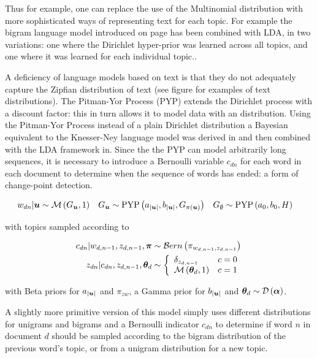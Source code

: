 Thus for example, one can replace the use of the Multinomial distribution with more sophisticated ways of representing text for each topic. For example the bigram language model introduced on page \pageref{sec:chap1:mackay-lang-model} has been combined with LDA, in two variations\cite{Wallach2006}: one where the Dirichlet hyper-prior was learned across all topics, and one where it was learned for each individual topic..

A deficiency of language models based on text is that they do not adequately capture the Zipfian distribution of text (see figure for examples of text distributions). The Pitman-Yor Process (PYP) extends the Dirichlet process with a discount factor: this in turn allows it to model data with an  distribution. Using the Pitman-Yor Process instead of a plain Dirichlet distribution a Bayesian equivalent to the Knesser-Ney language model was derived in\cite{Teh2002} and then combined with the LDA framework in\cite{Lindsey2012}. Since the the PYP can model arbitrarily long sequences, it is necessary to introduce a Bernoulli variable $c_{dn}$ for each word in each document to determine when the sequence of words has ended: a form of change-point detection. 

\begin{align}
w_{dn} | \bm u &\sim \mathcal{M} \left( {G_{\bm u}},{1} \right) &
G_{\bm u} &\sim \text{PYP}\left( a_{|\bm u|}, b_{|\bm u|}, G_{\pi(\bm u)} \right) &
G_{\emptyset} &\sim \text{PYP}\left( a_{0}, b_{0}, H \right)
\end{align}

with topics sampled according to

\begin{align}
c_{dn} | w_{d,n-1}, z_{d,n-1}, \bm \pi &\sim \mathcal{B}ern \left(\pi_{ w_{d,n-1}, z_{d,n-1}}\right) \\
z_{dn} | c_{dn}, z_{d,n-1}, { \bm \theta_d } & \sim \left\{ \begin{array}{lr}
     \delta_{z_{d,n - 1}} & c = 0 \\
     \mathcal{M} \left( {{ \bm \theta_d }},{1} \right) & c = 1
 \end{array}\right.
\end{align}

with Beta priors for $a_{|\bm u|}$ and $\pi_{zw}$, a Gamma prior for  $b_{|\bm u|}$ and ${ \bm \theta_d } \sim \mathcal{D} \left( {\bm \alpha} \right)$.

A slightly more primitive version of this model\cite{Wang2007} simply uses different distributions for unigrams and bigrams and a Bernoulli indicator $c_{dn}$ to determine if word $n$ in document $d$ should be sampled according to the bigram distribution of the previous word's topic, or from a unigram distribution for a new topic.

